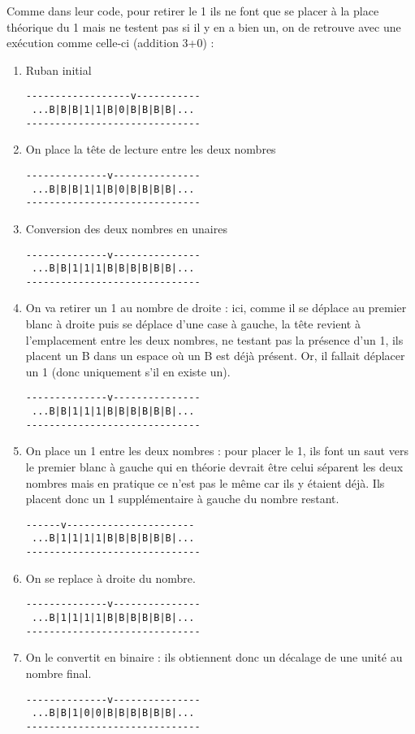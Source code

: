 \documentclass[a4paper,11pt]{article}
\begin{document}
Comme dans leur code, pour retirer le 1 ils ne font que se placer à la place théorique du 1 mais ne testent pas si il y en a bien un, on de retrouve avec une exécution comme celle-ci (addition 3+0) :
\begin{enumerate}
\item Ruban initial
\begin{verbatim}
------------------v-----------
 ...B|B|B|1|1|B|0|B|B|B|B|...
------------------------------
\end{verbatim}
\item On place la tête de lecture entre les deux nombres
\begin{verbatim}
--------------v---------------
 ...B|B|B|1|1|B|0|B|B|B|B|...
------------------------------
\end{verbatim}
\item Conversion des deux nombres en unaires
\begin{verbatim}
--------------v---------------
 ...B|B|1|1|1|B|B|B|B|B|B|...
------------------------------
\end{verbatim}
\item On va retirer un 1 au nombre de droite : ici, comme il se déplace au premier blanc à droite puis se déplace d'une case à gauche, la tête revient à l'emplacement entre les deux nombres, ne testant pas la présence d'un 1, ils placent un B dans un espace où un B est déjà présent. Or, il fallait déplacer un 1 (donc uniquement s'il en existe un).
\begin{verbatim}
--------------v---------------
 ...B|B|1|1|1|B|B|B|B|B|B|...
------------------------------
\end{verbatim}
\item On place un 1 entre les deux nombres : pour placer le 1, ils font un saut vers le premier blanc à gauche qui en théorie devrait être celui séparent les deux nombres mais en pratique ce n'est pas le même car ils y étaient déjà. Ils placent donc un 1 supplémentaire à gauche du nombre restant.
\begin{verbatim}
------v----------------------
 ...B|1|1|1|1|B|B|B|B|B|B|...
------------------------------
\end{verbatim}
\item On se replace à droite du nombre.
\begin{verbatim}
--------------v---------------
 ...B|1|1|1|1|B|B|B|B|B|B|...
------------------------------
\end{verbatim}
\item On le convertit en binaire : ils obtiennent donc un décalage de une unité au nombre final.
\begin{verbatim}
--------------v---------------
 ...B|B|1|0|0|B|B|B|B|B|B|...
------------------------------
\end{verbatim}
\end{enumerate}
\end{document}
